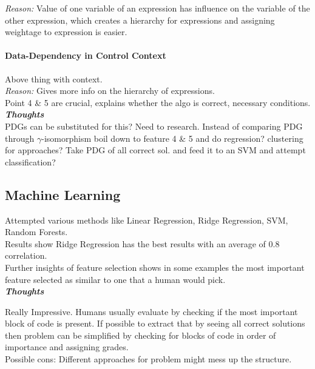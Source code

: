 \documentclass{article}
\begin{document}
\textit{Reason:} Value of one variable of an expression has influence on the variable of the other expression, which creates a hierarchy for expressions and assigning weightage to expression is easier.

\paragraph{Data-Dependency in Control Context}
Above thing with context.\\

\textit{Reason:} Gives more info on the hierarchy of expressions.\\

Point 4 \& 5 are crucial, explains whether the algo is correct, necessary conditions.\\

\textbf{\textit{Thoughts}
}\\
PDGs can be substituted for this? Need to research. Instead of comparing PDG through $\gamma$-isomorphism boil down to feature 4 \& 5 and do regression? clustering for approaches? Take PDG of all correct sol. and feed it to an SVM and attempt classification? 


\subsection{Machine Learning}

Attempted various methods like Linear Regression, Ridge Regression, SVM, Random Forests.\\

Results show Ridge Regression has the best results  with an average of 0.8 correlation.\\

Further insights of feature selection shows in some examples the most important feature selected as similar to one that a human would pick.\\ 

\textbf{\textit{Thoughts}}

Really Impressive. Humans usually evaluate by checking if the most important block of code is present. If possible to extract that by seeing all correct solutions then problem can be simplified by checking for blocks of code in order of importance and assigning grades.\\ 

Possible cons: Different approaches for problem might mess up the structure.\\ 
\end{document}
